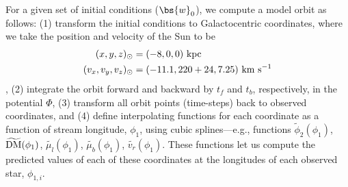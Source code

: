 \documentclass[letterpaper,12pt,preprint]{aastex}
\newcommand{\DM}{{\rm DM}}
\begin{document}
For a given set of initial conditions ($\bs{w}_0$), we compute a model orbit as follows: (1) transform the initial conditions to Galactocentric coordinates, where we take the position and velocity of the Sun to be 
\begin{align}
	(x,y,z)_\odot &= (-8,0,0)~{\rm kpc}\\
	(v_x,v_y,v_z)_\odot &= (-11.1, 220+24, 7.25)~{\rm km}~{\rm s}^{-1}
\end{align}
\citep{8kpc 	ref??, schonrich10, bovy12}, (2) integrate the orbit forward and backward by $t_f$ and $t_b$, respectively, in the potential $\Phi$, (3) transform all orbit points (time-steps) back to observed coordinates, and (4) define interpolating functions for each coordinate as a function of stream longitude, $\phi_1$, using cubic splines---e.g., functions $\widetilde{\phi}_{2}(\phi_1)$, $\widetilde{\DM}(\phi_1)$, $\widetilde{\mu_l}(\phi_1)$, $\widetilde{\mu_b}(\phi_1)$, $\widetilde{v_r}(\phi_1)$. These functions let us compute the predicted values of each of these coordinates at the longitudes of each observed star, $\phi_{1,i}$.
\end{document}
